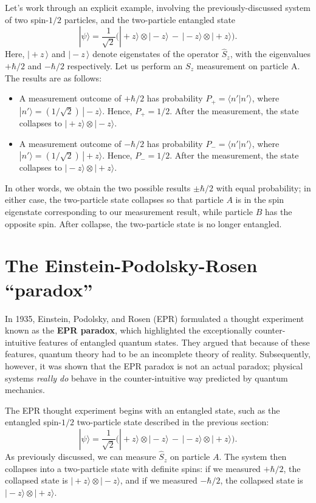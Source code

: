 \documentclass[pra,11pt]{revtex4}
\begin{document}
Let's work through an explicit example, involving the
previously-discussed system of two spin-$1/2$ particles, and the
two-particle entangled state
$$|\psi\rangle = \frac{1}{\sqrt{2}} \Big(|\!+\!z\rangle\otimes|\!-\!z\rangle \,-\, |\!-\!z\rangle\otimes|\!+\!z\rangle\Big).$$
Here, $|\!+\!z\,\rangle$ and $|\!-\!z\,\rangle$ denote eigenstates
of the operator $\hat{S}_z$, with the eigenvalues $+\hbar/2$ and $-\hbar/2$
respectively.  Let us perform an $S_z$ measurement on particle A.  The
results are as follows:
\begin{itemize}
\item A measurement outcome of $+\hbar/2$ has probability $P_+ = \langle
  n'|n'\rangle$, where $|n'\rangle =
  (1/\sqrt{2})\,|\!-\!z\rangle$.  Hence, $P_+ = 1/2$.  After the
  measurement, the state collapses to $|\!+\!z\rangle
  \otimes|\!-\!z\rangle$.

\item A measurement outcome of $-\hbar/2$ has probability $P_- = \langle
  n'|n'\rangle$, where $|n'\rangle =
  (1/\sqrt{2})\,|\!+\!z\rangle$.  Hence, $P_- = 1/2$.  After the
  measurement, the state collapses to $|\!-\!z\rangle
  \otimes|\!+\!z\rangle$.
\end{itemize}
In other words, we obtain the two possible results $\pm \hbar/2$ with
equal probability; in either case, the two-particle state collapses so
that particle $A$ is in the spin eigenstate corresponding to our
measurement result, while particle $B$ has the opposite spin.  After
collapse, the two-particle state is no longer entangled.

\section{The Einstein-Podolsky-Rosen ``paradox''}

In 1935, Einstein, Podolsky, and Rosen (EPR) formulated a thought
experiment known as the \textbf{EPR paradox}, which highlighted the
exceptionally counter-intuitive features of entangled quantum states.
They argued that because of these features, quantum theory had to be
an incomplete theory of reality.  Subsequently, however, it was shown
that the EPR paradox is not an actual paradox; physical systems
\textit{really do} behave in the counter-intuitive way predicted by
quantum mechanics.

The EPR thought experiment begins with an entangled state, such as the
entangled spin-$1/2$ two-particle state described in the previous section:
$$|\psi\rangle = \frac{1}{\sqrt{2}} \Big(|\!+\!z\rangle\otimes|\!-\!z\rangle \,-\, |\!-\!z\rangle\otimes|\!+\!z\rangle\Big).$$
As previously discussed, we can measure $\hat{S}_z$ on particle $A$.
The system then collapses into a two-particle state with definite
spins: if we measured $+\hbar/2$, the collapsed state is
$|\!+\!z\rangle \otimes|\!-\!z\rangle$, and if we measured $-\hbar/2$,
the collapsed state is $|\!-\!z\rangle\otimes|\!+\!z\rangle$.
\end{document}
